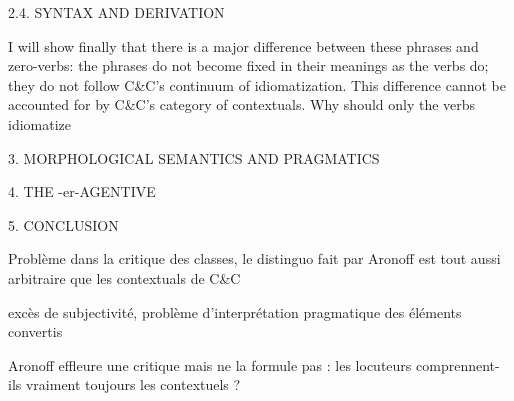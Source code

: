 \documentclass[a4paper,12pt]{article}
\begin{document}
 2.4. SYNTAX AND DERIVATION
 
 I will show finally that there is a major difference between these phrases
and zero-verbs: the phrases do not become fixed in their meanings as the verbs do;
they do not follow C\&C's continuum of idiomatization. This difference cannot be
accounted for by C\&C's category of contextuals. Why should only the verbs idiomatize

 3. MORPHOLOGICAL SEMANTICS AND PRAGMATICS
 
 4. THE -er-AGENTIVE
 
 5. CONCLUSION
  
 Problème dans la critique des classes, le distinguo fait par Aronoff est tout aussi arbitraire que les contextuals de C\&C 
 
 excès de subjectivité, problème d'interprétation pragmatique des éléments convertis
 
 Aronoff effleure une critique mais ne la formule pas : les locuteurs comprennent-ils vraiment toujours les contextuels ?
 
  
\end{document}
